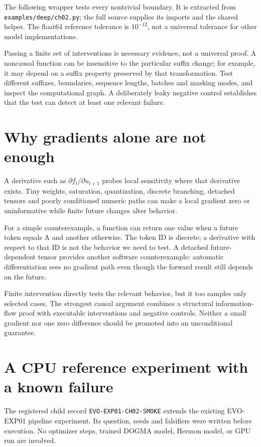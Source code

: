 The following wrapper tests every nontrivial boundary. It is extracted from \texttt{examples/deep/ch02.py}; the full source supplies its imports and the shared helper. The float64 reference tolerance is $10^{-12}$, not a universal tolerance for other model implementations.
\begin{minipage}{\linewidth}
\end{minipage}

Passing a finite set of interventions is necessary evidence, not a universal proof. A noncausal function can be insensitive to the particular suffix change; for example, it may depend on a suffix property preserved by that transformation. Test different suffixes, boundaries, sequence lengths, batches and masking modes, and inspect the computational graph. A deliberately leaky negative control establishes that the test can detect at least one relevant failure.

\section{Why gradients alone are not enough}
A derivative such as $\partial f_t/\partial u_{t+1}$ probes local sensitivity where that derivative exists. Tiny weights, saturation, quantization, discrete branching, detached tensors and poorly conditioned numeric paths can make a local gradient zero or uninformative while finite future changes alter behavior.

For a simple counterexample, a function can return one value when a future token equals A and another otherwise. The token ID is discrete; a derivative with respect to that ID is not the behavior we need to test. A detached future-dependent tensor provides another software counterexample: automatic differentiation sees no gradient path even though the forward result still depends on the future.

Finite intervention directly tests the relevant behavior, but it too samples only selected cases. The strongest causal argument combines a structural information-flow proof with executable interventions and negative controls. Neither a small gradient nor one zero difference should be promoted into an unconditional guarantee.

\section{A CPU reference experiment with a known failure}
The registered child record \texttt{EVO-EXP01-CH02-SMOKE} extends the existing EVO-EXP01 pipeline experiment. Its question, seeds and falsifiers were written before execution. No optimizer steps, trained DOGMA model, Hermon model, or GPU run are involved.

